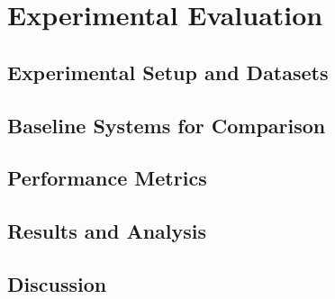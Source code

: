 \chapter{Experimental Evaluation}
\section{Experimental Setup and Datasets}
\section{Baseline Systems for Comparison}
\section{Performance Metrics}
\section{Results and Analysis}
\section{Discussion}